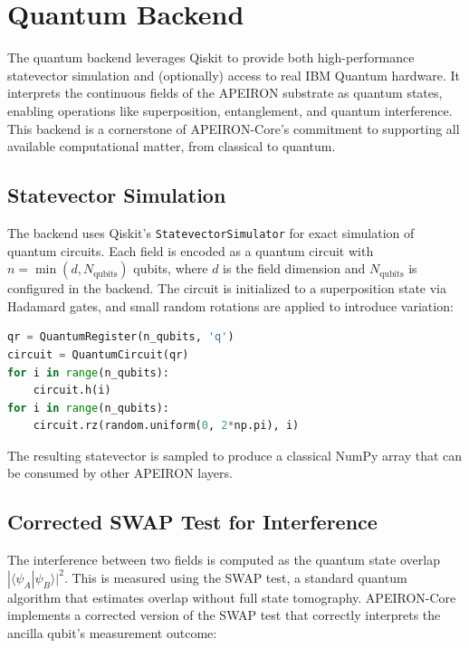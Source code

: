 \newpage
\section{Quantum Backend}

The quantum backend leverages Qiskit to provide both high-performance statevector simulation and (optionally) access to real IBM Quantum hardware. It interprets the continuous fields of the APEIRON substrate as quantum states, enabling operations like superposition, entanglement, and quantum interference. This backend is a cornerstone of APEIRON-Core's commitment to supporting all available computational matter, from classical to quantum.

\subsection{Statevector Simulation}

The backend uses Qiskit's \texttt{StatevectorSimulator} for exact simulation of quantum circuits. Each field is encoded as a quantum circuit with \(n = \min(d, N_{\text{qubits}})\) qubits, where \(d\) is the field dimension and \(N_{\text{qubits}}\) is configured in the backend. The circuit is initialized to a superposition state via Hadamard gates, and small random rotations are applied to introduce variation:

\begin{lstlisting}[language=Python, caption={Encoding a continuous field as a quantum circuit.}]
qr = QuantumRegister(n_qubits, 'q')
circuit = QuantumCircuit(qr)
for i in range(n_qubits):
    circuit.h(i)
for i in range(n_qubits):
    circuit.rz(random.uniform(0, 2*np.pi), i)
\end{lstlisting}

The resulting statevector is sampled to produce a classical NumPy array that can be consumed by other APEIRON layers.

\subsection{Corrected SWAP Test for Interference}

The interference between two fields is computed as the quantum state overlap \(|\langle \psi_A|\psi_B\rangle|^2\). This is measured using the SWAP test, a standard quantum algorithm that estimates overlap without full state tomography. APEIRON-Core implements a corrected version of the SWAP test that correctly interprets the ancilla qubit's measurement outcome:

